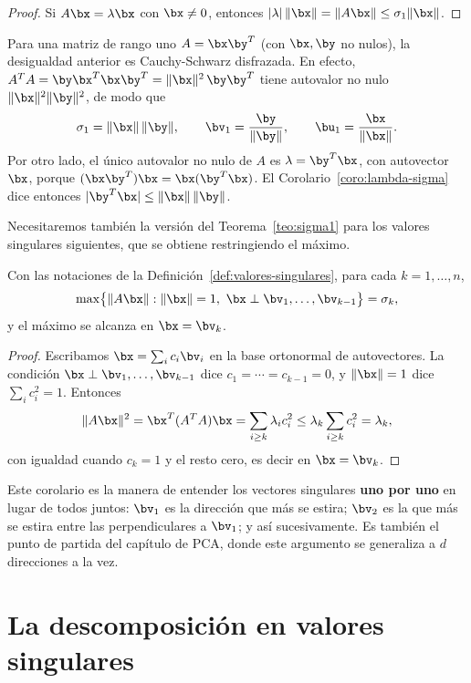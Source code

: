 \begin{proof}
Si $A\bx=\lambda\bx$ con $\bx\neq0$, entonces
$|\lambda|\,\|\bx\|=\|A\bx\|\le\sigma_1\|\bx\|$.
\end{proof}

\begin{example}\label{ej:rango1-sigma}
Para una matriz de rango uno $A=\bx\by^T$ (con $\bx,\by$ no nulos), la
desigualdad anterior es Cauchy-Schwarz disfrazada. En efecto, $A^TA
=\by\bx^T\bx\by^T=\|\bx\|^2\,\by\by^T$ tiene autovalor no nulo
$\|\bx\|^2\|\by\|^2$, de modo que
\[
\sigma_1=\|\bx\|\,\|\by\| ,
\qquad
\bv_1=\frac{\by}{\|\by\|},
\qquad
\bu_1=\frac{\bx}{\|\bx\|} .
\]
Por otro lado, el único autovalor no nulo de $A$ es $\lambda=\by^T\bx$, con
autovector $\bx$, porque $(\bx\by^T)\bx=\bx(\by^T\bx)$. El
Corolario~\ref{coro:lambda-sigma} dice entonces
$|\by^T\bx|\le\|\bx\|\,\|\by\|$.
\end{example}

Necesitaremos también la versión del Teorema~\ref{teo:sigma1} para los
valores singulares siguientes, que se obtiene restringiendo el máximo.

\begin{corollary}\label{coro:sigma-k}
Con las notaciones de la Definición~\ref{def:valores-singulares}, para cada
$k=1,\dots,n$,
\[
\max\bigl\{\|A\bx\| : \|\bx\|=1,\ \bx\perp\bv_1,\dots,\bv_{k-1}\bigr\}=\sigma_k ,
\]
y el máximo se alcanza en $\bx=\bv_k$.
\end{corollary}

\begin{proof}
Escribamos $\bx=\sum_i c_i\bv_i$ en la base ortonormal de autovectores. La
condición $\bx\perp\bv_1,\dots,\bv_{k-1}$ dice $c_1=\cdots=c_{k-1}=0$, y
$\|\bx\|=1$ dice $\sum_i c_i^2=1$. Entonces
\[
\|A\bx\|^2=\bx^T(A^TA)\bx=\sum_{i\ge k}\lambda_i c_i^2
\le\lambda_k\sum_{i\ge k}c_i^2=\lambda_k ,
\]
con igualdad cuando $c_k=1$ y el resto cero, es decir en $\bx=\bv_k$.
\end{proof}

Este corolario es la manera de entender los vectores singulares \textbf{uno
por uno} en lugar de todos juntos: $\bv_1$ es la dirección que más se estira;
$\bv_2$ es la que más se estira entre las perpendiculares a $\bv_1$; y así
sucesivamente. Es también el punto de partida del capítulo de PCA, donde este
argumento se generaliza a $d$ direcciones a la vez.

\section{La descomposición en valores singulares}
\label{sec:SVD}

